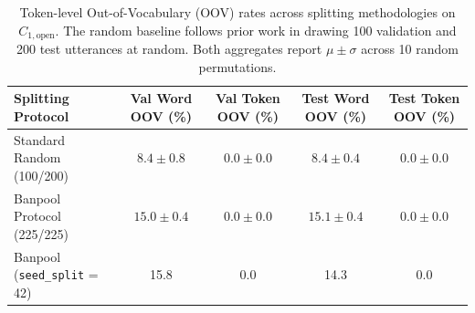 \begin{table}[h]
\centering
\caption{Token-level Out-of-Vocabulary (OOV) rates across splitting methodologies on $C_{1,\text{open}}$. The random baseline follows prior work in drawing 100 validation and 200 test utterances at random. Both aggregates report $\mu \pm \sigma$ across 10 random permutations.}
\label{tab:oov_analysis}
\begin{tabular}{lcccc}
\toprule
\textbf{Splitting Protocol} & \textbf{Val Word OOV (\%)} & \textbf{Val Token OOV (\%)} & \textbf{Test Word OOV (\%)} & \textbf{Test Token OOV (\%)} \\
\midrule
Standard Random (100/200) & $8.4 \pm 0.8$ & $0.0 \pm 0.0$ & $8.4 \pm 0.4$ & $0.0 \pm 0.0$ \\
Banpool Protocol (225/225) & $15.0 \pm 0.4$ & $0.0 \pm 0.0$ & $15.1 \pm 0.4$ & $0.0 \pm 0.0$ \\
Banpool (\texttt{seed\_split} = 42) & 15.8 & 0.0 & 14.3 & 0.0 \\
\bottomrule
\end{tabular}
\end{table}